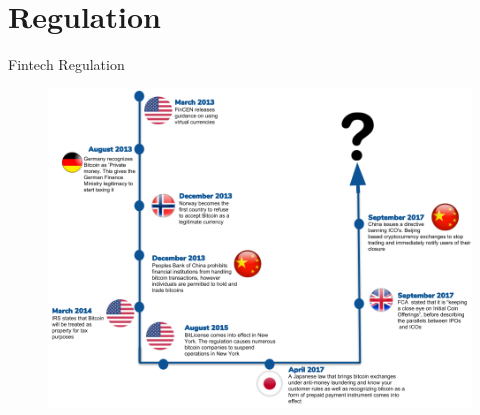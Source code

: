 \documentclass[9pt]{beamer}
\begin{document}

\section{Regulation}

\begin{frame}
	\begin{center}
		\begin{large}
			Fintech Regulation
		\end{large}
	\end{center}
\end{frame}




\begin{frame}{}
	\begin{figure}[]
		\centering
		\includegraphics  [scale=0.3]{Images/reg-timeline}
	\end{figure}
\end{frame}
\end{document}
